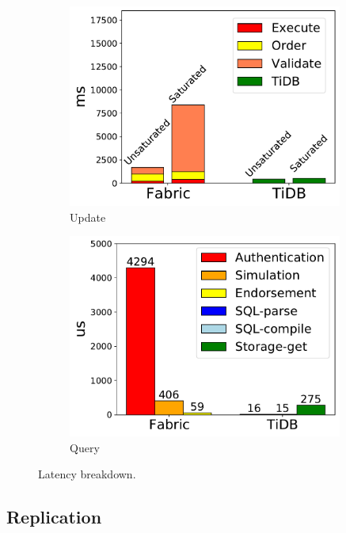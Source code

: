 \begin{figure}[tp]
	\centering
	\begin{subfigure}{0.49\textwidth}
		\includegraphics[width=0.99\textwidth]{chart/twin/update-breakdown-v2.pdf}
		\caption{Update}
		\label{chart:twin:update-breakdown}
	\end{subfigure}
	\begin{subfigure}{0.49\textwidth}
		\includegraphics[width=0.99\textwidth]{chart/twin/query-breakdown.pdf}
		\caption{Query}							
		\label{chart:twin:query-breakdown}		
	\end{subfigure}
	\caption{Latency breakdown.}
\end{figure}

\subsection{Replication}

